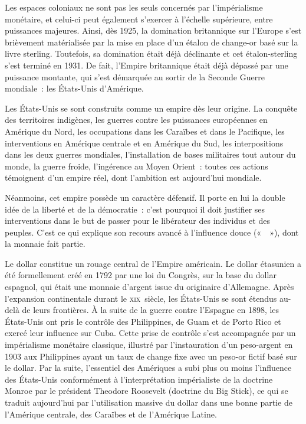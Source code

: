 
Les espaces coloniaux ne sont pas les seuls concernés par l'impérialisme monétaire, et celui-ci peut également s'exercer à l'échelle supérieure, entre puissances majeures. Ainsi, dès 1925, la domination britannique sur l'Europe s'est brièvement matérialisée par la mise en place  d'un étalon de change-or basé sur la livre sterling. Toutefois, sa domination était déjà déclinante et cet étalon-sterling s'est terminé en 1931. De fait, l'Empire britannique était déjà dépassé par une puissance montante, qui s'est démarquée au sortir de la Seconde Guerre mondiale~: les États-Unis d'Amérique.


Les États-Unis se sont construits comme un empire dès leur origine. La conquête des territoires indigènes, les guerres contre les puissances européennes en Amérique du Nord, les occupations dans les Caraïbes et dans le Pacifique, les interventions en Amérique centrale et en Amérique du Sud, les interpositions dans les deux guerres mondiales, l'installation de bases militaires tout autour du monde, la guerre froide, l'ingérence au Moyen Orient~: toutes ces actions témoignent d'un empire réel, dont l'ambition est aujourd'hui mondiale.

Néanmoins, cet empire possède un caractère défensif. Il porte en lui la double idée de la liberté et de la démocratie~: c'est pourquoi il doit justifier ses interventions dans le but de passer pour le libérateur des individus et des peuples. C'est ce qui explique son recours avancé à l'influence douce («~~»), dont la monnaie fait partie.  %

Le dollar constitue un rouage central de l'Empire américain. Le dollar étasunien a été formellement créé en 1792 par une loi du Congrès, sur la base du dollar espagnol, qui était une monnaie d'argent issue du  originaire d'Allemagne. Après l'expansion continentale durant le \textsc{xix}\ieme{}~siècle, les États-Unis se sont étendus au-delà de leurs frontières. À la suite de la guerre contre l'Espagne en 1898, les États-Unis ont pris le contrôle des Philippines, de Guam et de Porto Rico et exercé leur influence sur Cuba. Cette prise de contrôle s'est accompagnée par un impérialisme monétaire classique, illustré par l'instauration d'un peso-argent en 1903 aux Philippines ayant un taux de change fixe avec un peso-or fictif basé sur le dollar. Par la suite, l'essentiel des Amériques a subi plus ou moins l'influence des États-Unis conformément à l'interprétation impérialiste de la doctrine Monroe par le président Theodore Roosevelt (doctrine du Big Stick), ce qui se traduit aujourd'hui par l'utilisation massive du dollar dans une bonne partie de l'Amérique centrale, des Caraïbes et de l'Amérique Latine.

